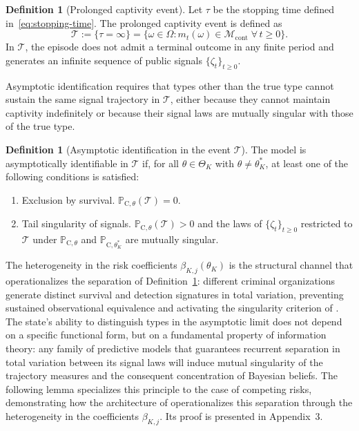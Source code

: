 \documentclass[review,authoryear,12pt]{elsarticle}
\theoremstyle{plain}
\theoremstyle{definition}
\newtheorem{definition}[theorem]{Definition}
\newcommand{\ProbC}[1]{\mathbb{P}_{\mathrm{C},#1}}
\newcommand{\ThetaK}{\Theta_K}
\newcommand{\1}{\mathbf{1}}
\begin{document}
\begin{definition}[Prolonged captivity event]\label{def:event-T-long}
Let $\tau$ be the stopping time defined in~\eqref{eq:stopping-time}. The prolonged captivity event is defined as
\[
\mathcal{T}:=\{\tau=\infty\}=\bigl\{\omega\in\Omega:m_t(\omega)\in\mathcal{M}_{\mathrm{cont}}\;\forall\,t\ge 0\bigr\}.
\]
In $\mathcal{T}$, the episode does not admit a terminal outcome in any finite period and generates an infinite sequence of public signals $\{\zeta_t\}_{t\ge 0}$.
\end{definition}

Asymptotic identification requires that types other than the true type cannot sustain the same signal trajectory in $\mathcal{T}$, either because they cannot maintain captivity indefinitely or because their signal laws are mutually singular with those of the true type.

\begin{definition}[Asymptotic identification in the event $\mathcal{T}$]\label{def:asymptotic-id}
The model is asymptotically identifiable in $\mathcal{T}$ if, for all $\theta\in\ThetaK$ with $\theta\neq\theta_K^\ast$, at least one of the following conditions is satisfied:
\begin{enumerate}
  \item[\textup{(a)}] Exclusion by survival. $\ProbC{\theta}(\mathcal{T})=0$.
  \item[\textup{(b)}] Tail singularity of signals. $\ProbC{\theta}(\mathcal{T})>0$ and the laws of $\{\zeta_t\}_{t\ge 0}$ restricted to $\mathcal{T}$ under $\ProbC{\theta}$ and $\ProbC{\theta_K^\ast}$ are mutually singular.
\end{enumerate}
\end{definition}

The heterogeneity in the risk coefficients $\beta_{K,j}(\theta_K)$ is the structural channel that operationalizes the separation of Definition~\ref{def:asymptotic-id}: different criminal organizations generate distinct survival and detection signatures in total variation, preventing sustained observational equivalence and activating the singularity criterion of \citet{Kakutani1948}. The state's ability to distinguish types in the asymptotic limit does not depend on a specific functional form, but on a fundamental property of information theory: any family of predictive models that guarantees recurrent separation in total variation between its signal laws will induce mutual singularity of the trajectory measures and the consequent concentration of Bayesian beliefs. The following lemma specializes this principle to the case of competing risks, demonstrating how the architecture of \citet{Cox1972} operationalizes this separation through the heterogeneity in the coefficients $\beta_{K,j}$. Its proof is presented in Appendix~3.
\end{document}
